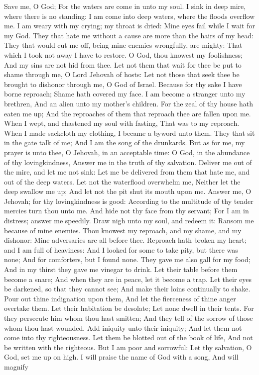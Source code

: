 Save me, O God; For the waters are come in unto my soul.  I sink in deep mire, where there is no standing: I am come into deep waters, where the floods overflow me.  I am weary with my crying; my throat is dried: Mine eyes fail while I wait for my God.  They that hate me without a cause are more than the hairs of my head: They that would cut me off, being mine enemies wrongfully, are mighty: That which I took not away I have to restore.  O God, thou knowest my foolishness; And my sins are not hid from thee.  Let not them that wait for thee be put to shame through me, O Lord Jehovah of hosts: Let not those that seek thee be brought to dishonor through me, O God of Israel.  Because for thy sake I have borne reproach; Shame hath covered my face.  I am become a stranger unto my brethren, And an alien unto my mother’s children.  For the zeal of thy house hath eaten me up; And the reproaches of them that reproach thee are fallen upon me.  When I wept, and chastened my soul with fasting, That was to my reproach.  When I made sackcloth my clothing, I became a byword unto them.  They that sit in the gate talk of me; And I am the song of the drunkards.  But as for me, my prayer is unto thee, O Jehovah, in an acceptable time: O God, in the abundance of thy lovingkindness, Answer me in the truth of thy salvation.  Deliver me out of the mire, and let me not sink: Let me be delivered from them that hate me, and out of the deep waters.  Let not the waterflood overwhelm me, Neither let the deep swallow me up; And let not the pit shut its mouth upon me.  Answer me, O Jehovah; for thy lovingkindness is good: According to the multitude of thy tender mercies turn thou unto me.  And hide not thy face from thy servant; For I am in distress; answer me speedily.  Draw nigh unto my soul, and redeem it: Ransom me because of mine enemies.  Thou knowest my reproach, and my shame, and my dishonor: Mine adversaries are all before thee.  Reproach hath broken my heart; and I am full of heaviness: And I looked for some to take pity, but there was none; And for comforters, but I found none.  They gave me also gall for my food; And in my thirst they gave me vinegar to drink.  Let their table before them become a snare; And when they are in peace, let it become a trap.  Let their eyes be darkened, so that they cannot see; And make their loins continually to shake.  Pour out thine indignation upon them, And let the fierceness of thine anger overtake them.  Let their habitation be desolate; Let none dwell in their tents.  For they persecute him whom thou hast smitten; And they tell of the sorrow of those whom thou hast wounded.  Add iniquity unto their iniquity; And let them not come into thy righteousness.  Let them be blotted out of the book of life, And not be written with the righteous.  But I am poor and sorrowful: Let thy salvation, O God, set me up on high.  I will praise the name of God with a song, And will magnify 